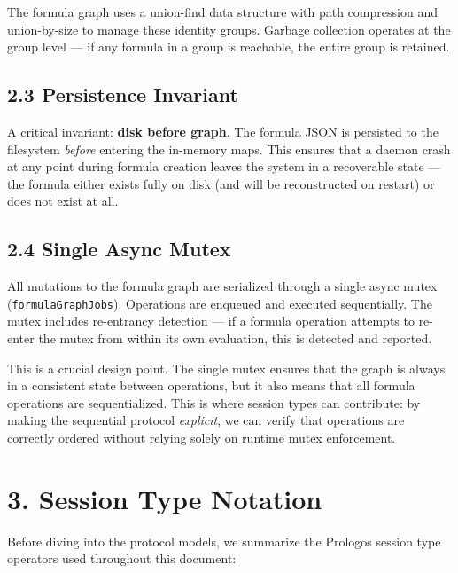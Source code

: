 \documentclass[11pt]{article}
\begin{document}
The formula graph uses a union-find data structure with path compression and
union-by-size to manage these identity groups. Garbage collection operates at
the group level --- if any formula in a group is reachable, the entire group
is retained.
\subsection{2.3 Persistence Invariant}
\label{sec:org4038f40}

A critical invariant: \textbf{disk before graph}. The formula JSON is persisted to
the filesystem \emph{before} entering the in-memory maps. This ensures that a
daemon crash at any point during formula creation leaves the system in a
recoverable state --- the formula either exists fully on disk (and will be
reconstructed on restart) or does not exist at all.
\subsection{2.4 Single Async Mutex}
\label{sec:orgd3cecdd}

All mutations to the formula graph are serialized through a single async
mutex (\texttt{formulaGraphJobs}). Operations are enqueued and executed
sequentially. The mutex includes re-entrancy detection --- if a formula
operation attempts to re-enter the mutex from within its own evaluation,
this is detected and reported.

This is a crucial design point. The single mutex ensures that the graph is
always in a consistent state between operations, but it also means that all
formula operations are sequentialized. This is where session types can
contribute: by making the sequential protocol \emph{explicit}, we can verify that
operations are correctly ordered without relying solely on runtime mutex
enforcement.
\section{3. Session Type Notation}
\label{sec:orge478b7b}

Before diving into the protocol models, we summarize the Prologos session
type operators used throughout this document:
\end{document}
